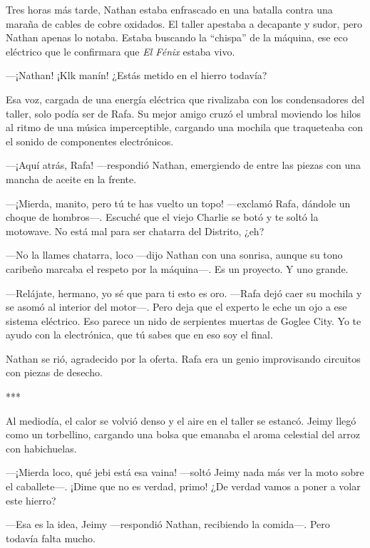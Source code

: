 \documentclass[11pt,twoside]{book}
\begin{document}
Tres horas más tarde, Nathan estaba enfrascado en una batalla contra una maraña de cables de cobre oxidados. El taller apestaba a decapante y sudor, pero Nathan apenas lo notaba. Estaba buscando la ``chispa'' de la máquina, ese eco eléctrico que le confirmara que \textit{El Fénix} estaba vivo.

---¡Nathan! ¡Klk manín! ¿Estás metido en el hierro todavía?

Esa voz, cargada de una energía eléctrica que rivalizaba con los condensadores del taller, solo podía ser de Rafa. Su mejor amigo cruzó el umbral moviendo los hilos al ritmo de una música imperceptible, cargando una mochila que traqueteaba con el sonido de componentes electrónicos.

---¡Aquí atrás, Rafa! ---respondió Nathan, emergiendo de entre las piezas con una mancha de aceite en la frente.

---¡Mierda, manito, pero tú te has vuelto un topo! ---exclamó Rafa, dándole un choque de hombros---. Escuché que el viejo Charlie se botó y te soltó la motowave. No está mal para ser chatarra del Distrito, ¿eh?

---No la llames chatarra, loco ---dijo Nathan con una sonrisa, aunque su tono caribeño marcaba el respeto por la máquina---. Es un proyecto. Y uno grande.

---Relájate, hermano, yo sé que para ti esto es oro. ---Rafa dejó caer su mochila y se asomó al interior del motor---. Pero deja que el experto le eche un ojo a ese sistema eléctrico. Eso parece un nido de serpientes muertas de Goglee City. Yo te ayudo con la electrónica, que tú sabes que en eso soy el final.

Nathan se rió, agradecido por la oferta. Rafa era un genio improvisando circuitos con piezas de desecho.

\bigskip
\begin{center}***\end{center}
\bigskip

Al mediodía, el calor se volvió denso y el aire en el taller se estancó. Jeimy llegó como un torbellino, cargando una bolsa que emanaba el aroma celestial del arroz con habichuelas.

---¡Mierda loco, qué jebi está esa vaina! ---soltó Jeimy nada más ver la moto sobre el caballete---. ¡Dime que no es verdad, primo! ¿De verdad vamos a poner a volar este hierro?

---Esa es la idea, Jeimy ---respondió Nathan, recibiendo la comida---. Pero todavía falta mucho.
\end{document}
